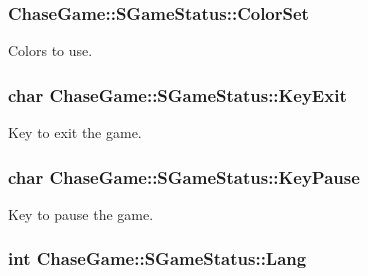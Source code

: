 \hypertarget{struct_chase_game_1_1_s_game_status_adc7431634611868499b650c2dc6a67b6}{
\subsubsection[{Color\-Set}]{ Chase\-Game\-::\-S\-Game\-Status\-::\-Color\-Set}}\label{struct_chase_game_1_1_s_game_status_adc7431634611868499b650c2dc6a67b6}


Colors to use. 

\hypertarget{struct_chase_game_1_1_s_game_status_a6a88e0903d13f10f4fcf8050157b2bdb}{
\subsubsection[{Key\-Exit}]{\setlength{\rightskip}{0pt plus 5cm}char Chase\-Game\-::\-S\-Game\-Status\-::\-Key\-Exit}}\label{struct_chase_game_1_1_s_game_status_a6a88e0903d13f10f4fcf8050157b2bdb}


Key to exit the game. 

\hypertarget{struct_chase_game_1_1_s_game_status_aaa0cca00432a2ac7fae4be521164f5c2}{
\subsubsection[{Key\-Pause}]{\setlength{\rightskip}{0pt plus 5cm}char Chase\-Game\-::\-S\-Game\-Status\-::\-Key\-Pause}}\label{struct_chase_game_1_1_s_game_status_aaa0cca00432a2ac7fae4be521164f5c2}


Key to pause the game. 

\hypertarget{struct_chase_game_1_1_s_game_status_a93c5db2ceb07569075406e865949b4d9}{
\subsubsection[{Lang}]{\setlength{\rightskip}{0pt plus 5cm}int Chase\-Game\-::\-S\-Game\-Status\-::\-Lang}}\label{struct_chase_game_1_1_s_game_status_a93c5db2ceb07569075406e865949b4d9}


